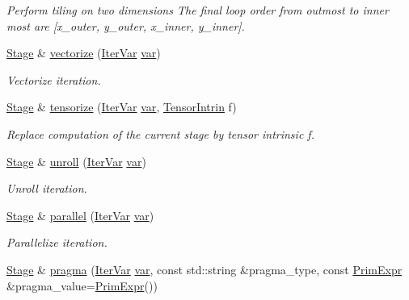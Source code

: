 \begin{DoxyCompactItemize}
\begin{DoxyCompactList}\small\item\em Perform tiling on two dimensions The final loop order from outmost to inner most are \mbox{[}x\+\_\+outer, y\+\_\+outer, x\+\_\+inner, y\+\_\+inner\mbox{]}. \end{DoxyCompactList}\item 
\hyperlink{classtvm_1_1te_1_1Stage}{Stage} \& \hyperlink{classtvm_1_1te_1_1Stage_a44d33e3920106e75dc7c68272f880812}{vectorize} (\hyperlink{classtvm_1_1tir_1_1IterVar}{Iter\+Var} \hyperlink{namespacetvm_1_1te_ae0c71f84710b436cbe0b32289d0838f4}{var})
\begin{DoxyCompactList}\small\item\em Vectorize iteration. \end{DoxyCompactList}\item 
\hyperlink{classtvm_1_1te_1_1Stage}{Stage} \& \hyperlink{classtvm_1_1te_1_1Stage_ab5fe485e1d730c36b096c060b8d2ef9d}{tensorize} (\hyperlink{classtvm_1_1tir_1_1IterVar}{Iter\+Var} \hyperlink{namespacetvm_1_1te_ae0c71f84710b436cbe0b32289d0838f4}{var}, \hyperlink{classtvm_1_1te_1_1TensorIntrin}{Tensor\+Intrin} f)
\begin{DoxyCompactList}\small\item\em Replace computation of the current stage by tensor intrinsic f. \end{DoxyCompactList}\item 
\hyperlink{classtvm_1_1te_1_1Stage}{Stage} \& \hyperlink{classtvm_1_1te_1_1Stage_af83ad8672660403504f472228b044b33}{unroll} (\hyperlink{classtvm_1_1tir_1_1IterVar}{Iter\+Var} \hyperlink{namespacetvm_1_1te_ae0c71f84710b436cbe0b32289d0838f4}{var})
\begin{DoxyCompactList}\small\item\em Unroll iteration. \end{DoxyCompactList}\item 
\hyperlink{classtvm_1_1te_1_1Stage}{Stage} \& \hyperlink{classtvm_1_1te_1_1Stage_a60a6be10a1a96cb594c1399efabafef3}{parallel} (\hyperlink{classtvm_1_1tir_1_1IterVar}{Iter\+Var} \hyperlink{namespacetvm_1_1te_ae0c71f84710b436cbe0b32289d0838f4}{var})
\begin{DoxyCompactList}\small\item\em Parallelize iteration. \end{DoxyCompactList}\item 
\hyperlink{classtvm_1_1te_1_1Stage}{Stage} \& \hyperlink{classtvm_1_1te_1_1Stage_a7045099f180e5cdcf9b1959b280a2d35}{pragma} (\hyperlink{classtvm_1_1tir_1_1IterVar}{Iter\+Var} \hyperlink{namespacetvm_1_1te_ae0c71f84710b436cbe0b32289d0838f4}{var}, const std\+::string \&pragma\+\_\+type, const \hyperlink{classtvm_1_1PrimExpr}{Prim\+Expr} \&pragma\+\_\+value=\hyperlink{classtvm_1_1PrimExpr}{Prim\+Expr}())

\end{DoxyCompactItemize}
